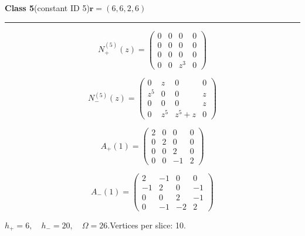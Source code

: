 \noindent\begin{minipage}{\linewidth}
\noindent\textbf{Class 5}\quad\small (constant ID 5)\hfill $\symbf{r}=(6,6,2,6)$
\par\smallskip\noindent\textcolor{rulegray}{\rule{\linewidth}{0.3pt}}
\begin{minipage}[c]{0.495\linewidth}\centering\fontsize{9.7}{12}\selectfont
\setlength{\abovedisplayskip}{4pt}\setlength{\belowdisplayskip}{4pt}
\setlength{\abovedisplayshortskip}{4pt}\setlength{\belowdisplayshortskip}{4pt}
\setlength{\arraycolsep}{3pt}\renewcommand{\arraystretch}{1.08}
\[N_{+}^{(5)}(z)=\begin{pmatrix}0 & 0 & 0 & 0\\0 & 0 & 0 & 0\\0 & 0 & 0 & 0\\0 & 0 & z^{3} & 0\end{pmatrix}\]
\end{minipage}%
\begin{minipage}[c]{0.495\linewidth}\centering\fontsize{9.7}{12}\selectfont
\setlength{\abovedisplayskip}{4pt}\setlength{\belowdisplayskip}{4pt}
\setlength{\abovedisplayshortskip}{4pt}\setlength{\belowdisplayshortskip}{4pt}
\setlength{\arraycolsep}{3pt}\renewcommand{\arraystretch}{1.08}
\[N_{-}^{(5)}(z)=\begin{pmatrix}0 & z & 0 & 0\\z^{5} & 0 & 0 & z\\0 & 0 & 0 & z\\0 & z^{5} & z^{5} + z & 0\end{pmatrix}\]
\end{minipage}%
\par\noindent
\begin{minipage}[c]{0.495\linewidth}\centering\fontsize{9.7}{12}\selectfont
\setlength{\abovedisplayskip}{4pt}\setlength{\belowdisplayskip}{4pt}
\setlength{\abovedisplayshortskip}{4pt}\setlength{\belowdisplayshortskip}{4pt}
\setlength{\arraycolsep}{3pt}\renewcommand{\arraystretch}{1.08}
\[A_{+}(1)=\begin{pmatrix}2 & 0 & 0 & 0\\0 & 2 & 0 & 0\\0 & 0 & 2 & 0\\0 & 0 & -1 & 2\end{pmatrix}\]
\end{minipage}%
\begin{minipage}[c]{0.495\linewidth}\centering\fontsize{9.7}{12}\selectfont
\setlength{\abovedisplayskip}{4pt}\setlength{\belowdisplayskip}{4pt}
\setlength{\abovedisplayshortskip}{4pt}\setlength{\belowdisplayshortskip}{4pt}
\setlength{\arraycolsep}{3pt}\renewcommand{\arraystretch}{1.08}
\[A_{-}(1)=\begin{pmatrix}2 & -1 & 0 & 0\\-1 & 2 & 0 & -1\\0 & 0 & 2 & -1\\0 & -1 & -2 & 2\end{pmatrix}\]
\end{minipage}%
\par\smallskip\noindent\small $h_+=6,\quad h_-=20,\quad \Omega=26.$\quad Vertices per slice: 10.
\end{minipage}\par\vfill
\clearpage
